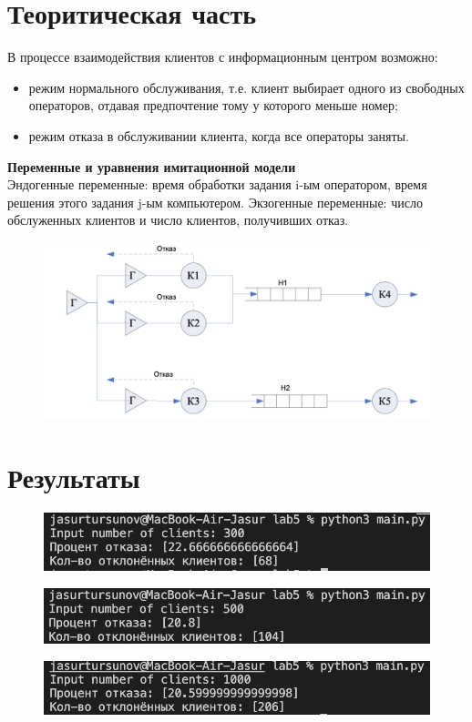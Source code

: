 \documentclass[a4paper, 12pt]{article}
\begin{document}
\section{{Теоритическая часть}}
\hspace*{5mm} В процессе взаимодействия клиентов с информационным центром возможно:
\begin{itemize}
	\item режим нормального обслуживания, т.е. клиент выбирает одного из свободных операторов, отдавая предпочтение тому у которого меньше номер;
	\item режим отказа в обслуживании клиента, когда все операторы заняты. 
\end{itemize}
\textbf{Переменные и уравнения имитационной модели }
\\ \hspace*{5mm} Эндогенные переменные: время обработки задания i-ым оператором, время решения этого задания j-ым компьютером.
\clearpage
\newpage
\hspace*{5mm}  Экзогенные переменные: число обслуженных клиентов и число клиентов, получивших отказ.
\begin{figure}[h!]
	\centering \includegraphics[scale=0.7]{schema1}
\end{figure}

\section{{Результаты}}
\begin{figure}[h!]
	\centering \includegraphics[scale=1]{300}
\end{figure}
\begin{figure}[h!]
	\centering \includegraphics[scale=1]{500}
\end{figure}
\begin{figure}[h!]
	\centering \includegraphics[scale=1]{1000}
\end{figure}
\end{document}
